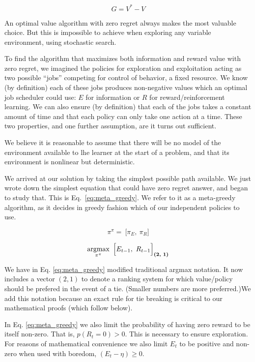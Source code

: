\begin{equation}
\label{eq:regret}
	G = V^* - V
\end{equation}

An optimal value algorithm with zero regret always makes the most valuable choice. But this is impossible to achieve when exploring any variable environment, using stochastic search. 

To find the algorithm that maximizes both information and reward value with zero regret, we imagined the policies for exploration and exploitation acting as two possible ``jobs'' competing for control of behavior, a fixed resource. We know (by definition) each of these jobs produces non-negative values which an optimal job scheduler could use: $E$ for information or $R$ for reward/reinforcement learning. We can also ensure (by definition) that each of the jobs takes a constant amount of time and that each policy can only take one action at a time. These two properties, and one further assumption, are it turns out sufficient.

We believe it is reasonable to assume that there will be no model of the environment available to lhe learner at the start of a problem, and that its environment is nonlinear but deterministic. 

We arrived at our solution by taking the simplest possible path available. We just wrote down the simplest equation that could have zero regret answer, and began to study that. This is Eq.~\ref{eq:meta_greedy}. We refer to it as a meta-greedy algorithm, as it decides in greedy fashion which of our independent policies to use.

\begin{equation}
\label{eq:pipi} 
\pi^{\pi} = \ \Big [ \pi_E,\ \pi_R \Big ]
\end{equation}

\begin{equation}
\label{eq:meta_greedy} 
	\operatorname*{argmax}_{\pi^{\pi}} \ \Big [ E_{t-1},\ R_{t-1} \Big ]_{\textbf{(2, 1)}}
\end{equation}
	
We have in Eq. \ref{eq:meta_greedy} modified traditional argmax notation. It now includes a vector $(2,1)$ to denote a ranking system for which value/policy should be prefered in the event of a tie. (Smaller numbers are more preferred.)We add this notation because an exact rule for tie breaking is critical to our mathematical proofs (which follow below). 

In Eq. \ref{eq:meta_greedy} we also limit the probability of having zero reward to be itself non-zero. That is, $p(R_t=0) > 0$. This is necessary to ensure exploration. For reasons of mathematical convenience we also limit $E_t$ to be positive and non-zero when used with boredom, $(E_t - \eta) \geq 0$. 

